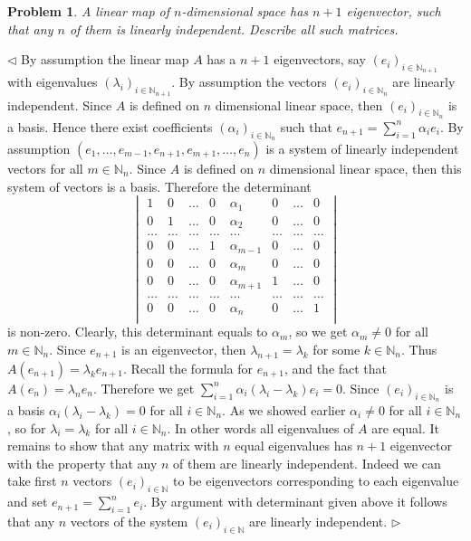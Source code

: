 \documentclass[12pt]{article}
\newtheorem{problem}{Problem}[subsection]
\newenvironment{solution}{\par $\triangleleft$}{$\triangleright$}
\begin{document}
\begin{problem} A linear map of $n$-dimensional space has $n+1$ eigenvector, such that any $n$ of them is linearly independent. Describe all such matrices.
\end{problem}
\begin{solution} By assumption the linear map $A$ has a $n+1$ eigenvectors, say $(e_i)_{i\in\mathbb{N}_{n+1}}$ with eigenvalues $(\lambda_i)_{i\in\mathbb{N}_{n+1}}$. By assumption the vectors $(e_i)_{i\in\mathbb{N}_n}$ are linearly independent. Since $A$ is defined on $n$ dimensional linear space, then $(e_i)_{i\in\mathbb{N}_n}$ is a basis. Hence there exist coefficients $(\alpha_i)_{i\in\mathbb{N}_n}$ such that $e_{n+1}=\sum_{i=1}^n \alpha_i e_i$. By assumption $(e_1,\ldots,e_{m-1},e_{n+1},e_{m+1},\ldots,e_n)$ is a system of linearly independent vectors for all $m\in\mathbb{N}_n$. Since $A$ is defined on $n$ dimensional linear space, then this system of vectors is a basis. Therefore the determinant 
$$
\begin{vmatrix}
1      & 0      & \ldots & 0      & \alpha_1     & 0      & \ldots & 0      \\
0      & 1      & \ldots & 0      & \alpha_2     & 0      & \ldots & 0      \\
\ldots & \ldots & \ldots & \ldots & \ldots       & \ldots & \ldots & \ldots \\
0      & 0      & \ldots & 1      & \alpha_{m-1} & 0      & \ldots & 0      \\
0      & 0      & \ldots & 0      & \alpha_{m}   & 0      & \ldots & 0      \\
0      & 0      & \ldots & 0      & \alpha_{m+1} & 1      & \ldots & 0      \\
\ldots & \ldots & \ldots & \ldots & \ldots       & \ldots & \ldots & \ldots \\
0      & 0      & \ldots & 0      & \alpha_n     & 0      & \ldots & 1      \\
\end{vmatrix}
$$
is non-zero. Clearly, this determinant equals to $\alpha_m$, so we get $\alpha_m\neq 0$ for all $m\in\mathbb{N}_n$. Since $e_{n+1}$ is an eigenvector, then $\lambda_{n+1}=\lambda_k$ for some $k\in\mathbb{N}_n$. Thus $A(e_{n+1})=\lambda_k e_{n+1}$. Recall the formula for $e_{n+1}$, and the fact that $A(e_n)=\lambda_n e_n$. Therefore we get $\sum_{i=1}^n\alpha_i(\lambda_i-\lambda_k)e_i=0$. Since $(e_i)_{i\in\mathbb{N}_n}$ is a basis $\alpha_i(\lambda_i-\lambda_k)=0$ for all $i\in\mathbb{N}_n$. As we showed earlier $\alpha_i\neq 0$ for all $i\in\mathbb{N}_n$, so for $\lambda_i=\lambda_k$ for all $i\in\mathbb{N}_n$. In other words all eigenvalues of $A$ are equal. It remains to show that any matrix with $n$ equal eigenvalues has $n+1$ eigenvector with the property that any $n$ of them are linearly independent. Indeed we can take first $n$ vectors $(e_i)_{i\in\mathbb{N}}$ to be eigenvectors corresponding to each eigenvalue and set $e_{n+1}=\sum_{i=1}^n e_i$. By argument with determinant given above it follows that any $n$ vectors of the system $(e_i)_{i\in\mathbb{N}}$ are linearly independent.  
\end{solution}
 
\end{document}

